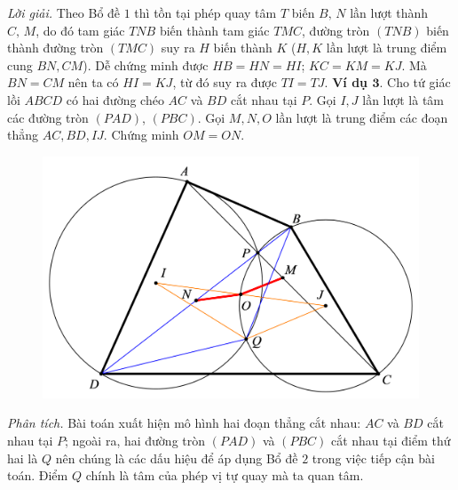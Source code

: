 \begin{multicols}{2}
\begin{figure}[H]
		\vspace*{-10pt}
	\end{figure}
	\textit{Lời giải.} Theo Bổ đề $1$ thì tồn tại phép quay tâm $T$ biến $B,\,N$ lần lượt thành $C,\,M$, do đó tam giác $TNB$ biến thành tam giác $TMC$, đường tròn $(TNB)$ biến thành đường tròn $(TMC)$ suy ra $H$ biến thành $K$ ($H, K$ lần lượt là trung điểm cung $BN,CM$). Dễ chứng minh được $HB=HN=HI$; $KC=KM=KJ$. Mà $BN=CM$ nên ta có $HI=KJ$, từ đó suy ra được $TI=TJ$.
	\vskip 0.1cm
	\textbf{\color{diendantoanhoc}Ví dụ $\pmb{3.}$} Cho tứ giác lồi $ABCD$ có hai đường chéo $AC$ và $BD$ cắt nhau tại $P$. Gọi $I,J$ lần lượt là tâm các đường tròn $(PAD)$, $(PBC)$. Gọi $M,N,O$ lần lượt là trung điểm các đoạn thẳng $AC,BD,IJ$. Chứng minh $OM=ON$.
	\begin{figure}[H]
		\vspace*{-5pt}
		\centering
		\captionsetup{labelformat= empty, justification=centering}
		\includegraphics[width= 1\linewidth]{6}
		\vspace*{-15pt}
	\end{figure}
	\textit{Phân tích.} Bài toán xuất hiện mô hình hai đoạn thẳng cắt nhau: $AC$ và $BD$ cắt nhau tại $P$; ngoài ra, hai đường tròn $(PAD)$ và $(PBC)$ cắt nhau tại điểm thứ hai là $Q$ nên chúng là các dấu hiệu để áp dụng Bổ đề $2$ trong việc tiếp cận bài toán. Điểm $Q$ chính là tâm của phép vị tự quay mà ta quan tâm.
	\begin{figure}[H]
		\vspace*{-10pt}
		\centering
		\captionsetup{labelformat= empty, justification=centering}

\end{figure}
\end{multicols}
